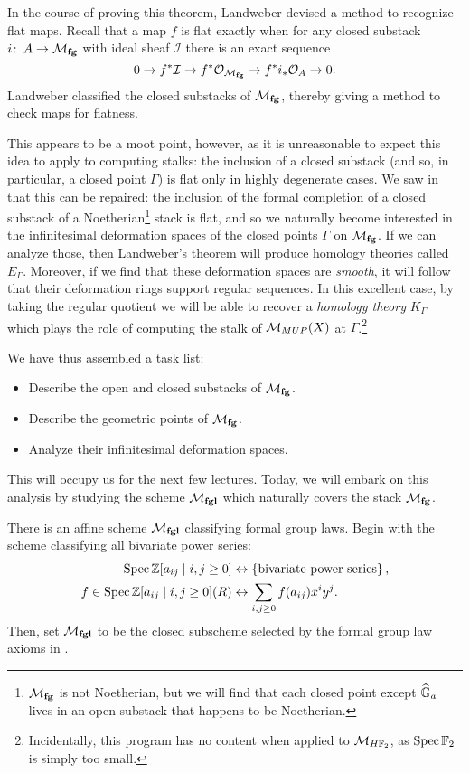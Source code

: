 \noindent In the course of proving this theorem, Landweber devised a method to recognize flat maps.  Recall that a map $f$ is flat exactly when for any closed substack $i\colon\thinspace A \to \mathcal{M}_{\mathbf{fg}}$ with ideal sheaf $\mathcal I$ there is an exact sequence \[0 \to f^* \mathcal I \to f^* \mathcal O_{\mathcal{M}_{\mathbf{fg}}} \to f^* i_* \mathcal O_A \to 0.\]  Landweber classified the closed substacks of $\mathcal{M}_{\mathbf{fg}}$, thereby giving a method to check maps for flatness.

This appears to be a moot point, however, as it is unreasonable to expect this idea to apply to computing stalks: the inclusion of a closed substack (and so, in particular, a closed point $\Gamma$) is flat only in highly degenerate cases.  We saw in  that this can be repaired: the inclusion of the formal completion of a closed substack of a Noetherian\footnote{$\mathcal{M}_{\mathbf{fg}}$ is not Noetherian, but we will find that each closed point except $\widehat{\mathbb G}_a$ lives in an open substack that happens to be Noetherian.} stack is flat, and so we naturally become interested in the infinitesimal deformation spaces of the closed points $\Gamma$ on $\mathcal{M}_{\mathbf{fg}}$.  If we can analyze those, then Landweber's theorem will produce homology theories called $E_\Gamma$.  Moreover, if we find that these deformation spaces are \emph{smooth}, it will follow that their deformation rings support regular sequences.  In this excellent case, by taking the regular quotient we will be able to recover a \emph{homology theory} $K_\Gamma$ which plays the role of computing the stalk of $\mathcal{M}_{MUP}(X)$ at $\Gamma$.\footnote{Incidentally, this program has no content when applied to $\mathcal{M}_{H\mathbb F_2}$, as $\operatorname{Spec} \mathbb F_2$ is simply too small.}

We have thus assembled a task list:
\begin{itemize}
\item Describe the open and closed substacks of $\mathcal{M}_{\mathbf{fg}}$.
\item Describe the geometric points of $\mathcal{M}_{\mathbf{fg}}$.
\item Analyze their infinitesimal deformation spaces.
\end{itemize}
This will occupy us for the next few lectures.  Today, we will embark on this analysis by studying the scheme $\mathcal{M}_{\mathbf{fgl}}$ which naturally covers the stack $\mathcal{M}_{\mathbf{fg}}$.

\begin{definition}
There is an affine scheme $\mathcal{M}_{\mathbf{fgl}}$ classifying formal group laws.  Begin with the scheme classifying all bivariate power series:
\begin{align*}
\operatorname{Spec} \mathbb Z[a_{ij} \mid i, j \ge 0] & \leftrightarrow \left\{ \text{bivariate power series} \right\}, \\
f \in \operatorname{Spec}\mathbb Z[a_{ij} \mid i, j \ge 0](R) & \leftrightarrow \sum_{i, j \ge 0} f(a_{ij}) x^i y^j.
\end{align*}
Then, set $\mathcal{M}_{\mathbf{fgl}}$ to be the closed subscheme selected by the formal group law axioms in .
\end{definition}

